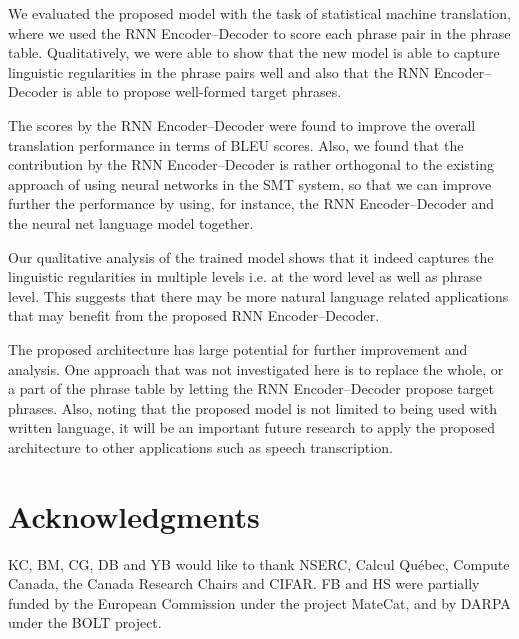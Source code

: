 We evaluated the proposed model with the task of statistical machine
translation, where we used the RNN Encoder--Decoder to score each phrase pair in
the phrase table. Qualitatively, we were able to show that the new model is
able to capture linguistic regularities in the phrase pairs well and also that
the RNN Encoder--Decoder is able to propose well-formed target phrases. 

The scores by the RNN Encoder--Decoder were found to improve the overall
translation performance in terms of BLEU scores. Also, we found that the
contribution by the RNN Encoder--Decoder is rather orthogonal to the existing
approach of using neural networks in the SMT system, so that we can improve
further the performance by using, for instance, the RNN Encoder--Decoder and the
neural net language model together.

Our qualitative analysis of the trained model shows that it indeed captures the
linguistic regularities in multiple levels i.e. at the word level as well as phrase level.
This suggests that there may be more natural language related applications that
may benefit from the proposed RNN Encoder--Decoder.

The proposed architecture has large potential for further improvement and
analysis. One approach that was not investigated here is to replace the whole,
or a part of the phrase table by letting the RNN Encoder--Decoder propose
target phrases. Also, noting that the proposed model is not limited to being
used with written language, it will be an important future research to apply the
proposed architecture to other applications such as speech transcription.

\section*{Acknowledgments}

KC, BM, CG, DB and YB would like to thank  NSERC, Calcul Qu\'{e}bec, Compute
Canada, the Canada Research Chairs and CIFAR. FB and HS were partially funded
by the European Commission under the project MateCat, and by DARPA under the
BOLT project.





